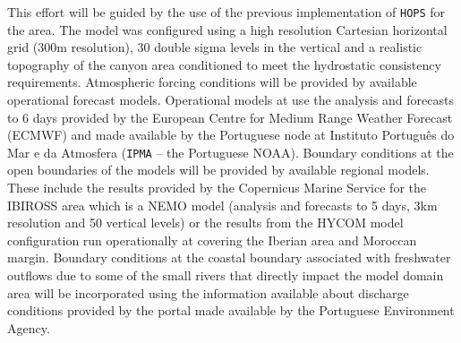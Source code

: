 This effort will be guided by the use of the previous implementation
of \texttt{HOPS} for the \naz area. The model was configured using a
high resolution Cartesian horizontal grid (300m resolution), 30 double
sigma levels in the vertical and a realistic topography of the \naz
canyon area conditioned to meet the hydrostatic consistency
requirements.  Atmospheric forcing conditions will be provided by
available operational forecast models. Operational models at \inst use
the analysis and forecasts to 6 days provided by the European Centre
for Medium Range Weather Forecast (ECMWF) and made available by the
Portuguese node at Instituto Portugu\^{e}s do Mar e da Atmosfera
(\texttt{IPMA} -- the Portuguese NOAA).  Boundary conditions at the
open boundaries of the models will be provided by available regional
models. These include the results provided by the Copernicus Marine
Service for the IBIROSS area which is a NEMO model (analysis and
forecasts to 5 days, 3km resolution and 50 vertical levels) or the
results from the HYCOM model configuration run operationally at \inst
covering the Iberian area and Moroccan margin.  Boundary conditions at
the coastal boundary associated with freshwater outflows due to some
of the small rivers that directly impact the model domain area will be
incorporated using the information available about discharge
conditions provided by the  portal  made available by the Portuguese
Environment Agency.


